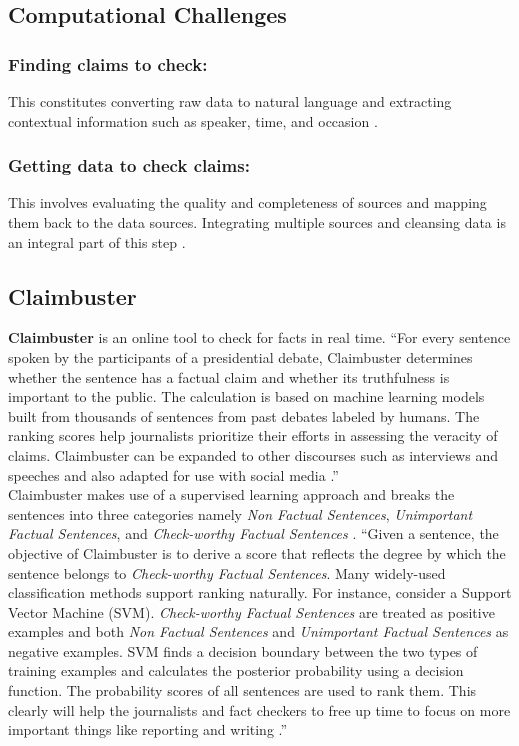 \documentclass[sigconf]{acmart}
\begin{document}
\subsection{Computational Challenges} 
\subsubsection{\textbf{Finding claims to check:}} This constitutes converting raw data to natural language and extracting contextual information such as speaker, time, and occasion \cite{Hassan2015}.
\subsubsection{\textbf{Getting data to check claims:}} This involves evaluating the quality and completeness of sources and mapping them back to the data sources. Integrating multiple sources and cleansing data is an integral part of this step \cite{Hassan2015}.

\subsection{Claimbuster}
\textbf{Claimbuster} is an online tool to check for facts in real time. ``For every sentence spoken by the participants of a presidential debate, Claimbuster determines whether the sentence has a factual claim and whether its truthfulness is important to the public. The calculation is based on machine learning models built from thousands of sentences from past debates labeled by humans. The ranking scores help journalists prioritize their efforts in assessing the veracity of claims. Claimbuster can be expanded to other discourses such as interviews and speeches and also adapted for use with social media \cite{Hassan2015}.'' \\
Claimbuster makes use of a supervised learning approach and breaks the sentences into three categories namely \textit{Non Factual Sentences}, \textit{Unimportant Factual Sentences}, and \textit{Check-worthy Factual Sentences} \cite{Hassan2015}. ``Given a sentence, the objective of Claimbuster is to derive a score that reflects the degree by which the sentence belongs to \textit{Check-worthy Factual Sentences}. Many widely-used classification methods support ranking naturally. For instance, consider a Support Vector Machine (SVM). \textit{Check-worthy Factual Sentences} are treated as positive examples and both \textit{Non Factual Sentences} and \textit{Unimportant Factual Sentences} as negative examples. SVM finds a decision boundary between the two types of training examples and calculates the posterior probability using a decision function. The probability scores of all sentences are used to rank them. This clearly will help the journalists and fact checkers to free up time to focus on more important things like reporting and writing \cite{Hassan2015}.''
\end{document}
